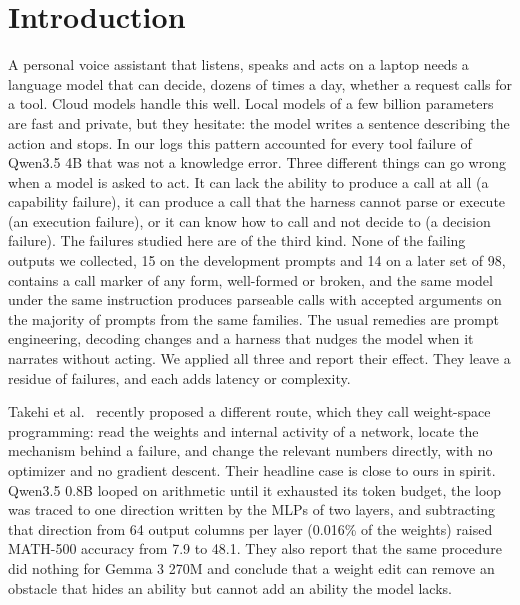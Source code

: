 \documentclass[11pt]{article}
\begin{document}
\section{Introduction}

A personal voice assistant that listens, speaks and acts on a laptop needs a language model that can decide, dozens of times a day, whether a request calls for a tool. Cloud models handle this well. Local models of a few billion parameters are fast and private, but they hesitate: the model writes a sentence describing the action and stops. In our logs this pattern accounted for every tool failure of Qwen3.5 4B that was not a knowledge error. Three different things can go wrong when a model is asked to act. It can lack the ability to produce a call at all (a capability failure), it can produce a call that the harness cannot parse or execute (an execution failure), or it can know how to call and not decide to (a decision failure). The failures studied here are of the third kind. None of the failing outputs we collected, 15 on the development prompts and 14 on a later set of 98, contains a call marker of any form, well-formed or broken, and the same model under the same instruction produces parseable calls with accepted arguments on the majority of prompts from the same families. The usual remedies are prompt engineering, decoding changes and a harness that nudges the model when it narrates without acting. We applied all three and report their effect. They leave a residue of failures, and each adds latency or complexity.

Takehi et al.~\citep{takehi2026weightspace} recently proposed a different route, which they call weight-space programming: read the weights and internal activity of a network, locate the mechanism behind a failure, and change the relevant numbers directly, with no optimizer and no gradient descent. Their headline case is close to ours in spirit. Qwen3.5 0.8B looped on arithmetic until it exhausted its token budget, the loop was traced to one direction written by the MLPs of two layers, and subtracting that direction from 64 output columns per layer (0.016\% of the weights) raised MATH-500 accuracy from 7.9 to 48.1. They also report that the same procedure did nothing for Gemma 3 270M and conclude that a weight edit can remove an obstacle that hides an ability but cannot add an ability the model lacks.
\end{document}
